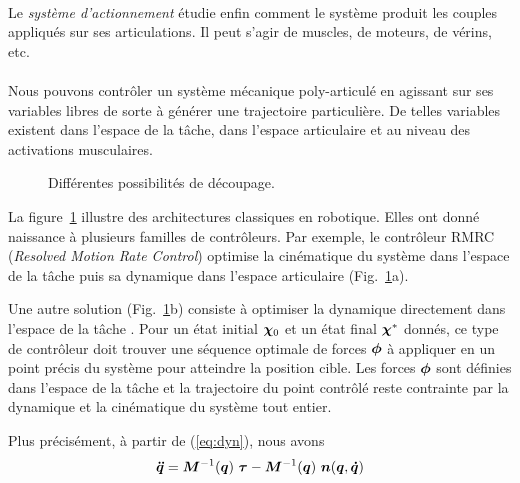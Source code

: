 \documentclass[pdftex,a4paper,11pt]{article}
\begin{document}
\paragraph{}
Le {\em système d'actionnement} étudie enfin comment le système produit
les couples appliqués sur ses articulations. Il peut s'agir de muscles,
de moteurs, de vérins, etc.

\paragraph{}
Nous pouvons contrôler un système mécanique poly-articulé en agissant sur
ses variables libres de sorte à générer une trajectoire particulière.
De telles variables existent dans l'espace de la tâche, dans l'espace
articulaire et au niveau des activations musculaires.

\begin{figure}[ht]
    \centering
    
    \caption{Différentes possibilités de découpage.}
    \label{fig:solutions}
\end{figure}

La figure~\ref{fig:solutions} illustre des architectures classiques en robotique.
Elles ont donné naissance à plusieurs familles de contrôleurs.
Par exemple, le con\-trô\-leur RMRC ({\em Resolved Motion Rate Control}) \cite{whitney69}
optimise la cinématique du système dans l'espace de la tâche puis sa dynamique
dans l'espace articulaire (Fig.~\ref{fig:solutions}a).

Une autre solution (Fig.~\ref{fig:solutions}b) consiste à optimiser la
dynamique directement dans l'espace de la tâche \cite{khatib87}. Pour un
état initial $\boldsymbol{\chi}_0$ et un état final $\boldsymbol{\chi}^*$ donnés, ce
type de contrôleur doit trouver une séquence optimale de forces $\boldsymbol{\phi}$ à
appliquer en un point précis du système pour atteindre la position cible.  Les
forces $\boldsymbol{\phi}$ sont définies dans l'espace de la tâche et la trajectoire du
point contrôlé reste contrainte par la dynamique et la cinématique du système
tout entier.


Plus précisément, à partir de (\ref{eq:dyn}), nous avons
\begin{equation}
    \label{eq:invdyn}
    \boldsymbol{\ddot{q}} = \boldsymbol{M}^{-1}(\boldsymbol{q}) ~ \boldsymbol{\tau} - \boldsymbol{M}^{-1}( \boldsymbol{q} ) ~ \boldsymbol{n}( \boldsymbol{q}, \boldsymbol{\dot{q}} )
\end{equation}
\end{document}
